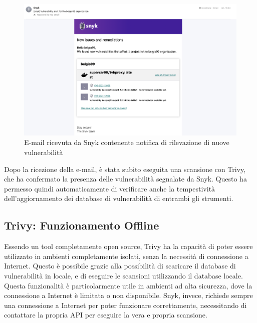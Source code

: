 \begin{figure}[H]
   \centering
   \includegraphics[width=1\textwidth]{immagini/capitolo2/snyk_email.png}
   \caption{E-mail ricevuta da Snyk contenente notifica di rilevazione di nuove vulnerabilità}
   \label{fig:snyk_email}
\end{figure}

Dopo la ricezione della e-mail, è stata subito eseguita una scansione con Trivy, che ha confermato la presenza delle vulnerabilità segnalate da Snyk. Questo ha permesso quindi automaticamente di verificare anche la tempestività dell'aggiornamento dei database di vulnerabilità di entrambi gli strumenti.

\subsection{Trivy: Funzionamento Offline}
Essendo un tool completamente open source, Trivy ha la capacità di poter essere utilizzato in ambienti completamente isolati, senza la necessità di connessione a Internet. Questo è possibile grazie alla possibilità di scaricare il database di vulnerabilità in locale, e di eseguire le scansioni utilizzando il database locale. Questa funzionalità è particolarmente utile in ambienti ad alta sicurezza, dove la connessione a Internet è limitata o non disponibile. Snyk, invece, richiede sempre una connessione a Internet per poter funzionare correttamente, necessitando di contattare la propria API per eseguire la vera e propria scansione.

